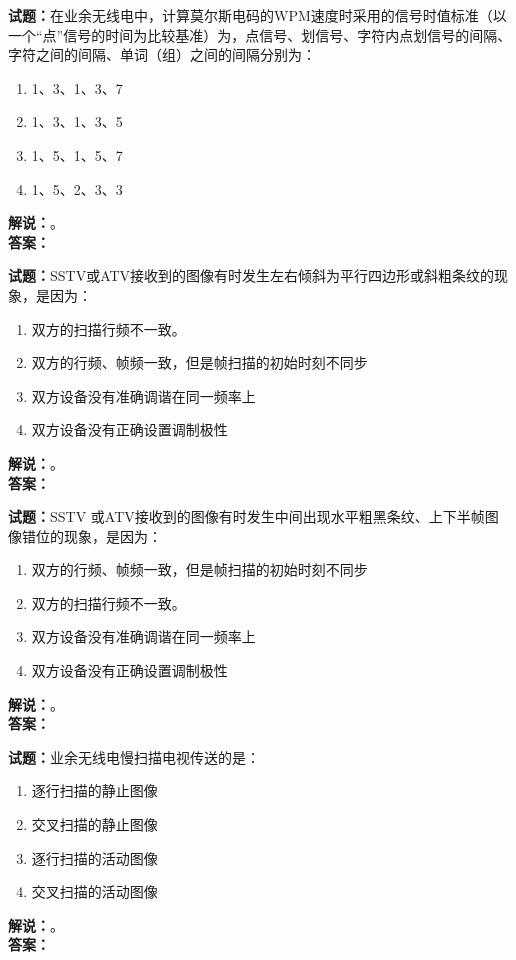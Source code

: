 \documentclass{ctexbook}
\begin{document}
\bigskip

\noindent\textbf{试题：}在业余无线电中，计算莫尔斯电码的WPM速度时采用的信号时值标准（以一个“点”信号的时间为比较基准）为，点信号、划信号、字符内点划信号的间隔、字符之间的间隔、单词（组）之间的间隔分别为：
\begin{enumerate}[leftmargin=3em]
  \item 1、3、1、3、7
  \item 1、3、1、3、5
  \item 1、5、1、5、7
  \item 1、5、2、3、3
\end{enumerate}
\noindent\textbf{解说：}\textbf{}。\\\noindent\textbf{答案：}

\bigskip

\noindent\textbf{试题：}SSTV或ATV接收到的图像有时发生左右倾斜为平行四边形或斜粗条纹的现象，是因为：
\begin{enumerate}[leftmargin=3em]
  \item 双方的扫描行频不一致。
  \item 双方的行频、帧频一致，但是帧扫描的初始时刻不同步
  \item 双方设备没有准确调谐在同一频率上
  \item 双方设备没有正确设置调制极性
\end{enumerate}
\noindent\textbf{解说：}\textbf{}。\\\noindent\textbf{答案：}

\bigskip

\noindent\textbf{试题：}SSTV 或ATV接收到的图像有时发生中间出现水平粗黑条纹、上下半帧图像错位的现象，是因为：
\begin{enumerate}[leftmargin=3em]
  \item 双方的行频、帧频一致，但是帧扫描的初始时刻不同步
  \item 双方的扫描行频不一致。
  \item 双方设备没有准确调谐在同一频率上
  \item 双方设备没有正确设置调制极性
\end{enumerate}
\noindent\textbf{解说：}\textbf{}。\\\noindent\textbf{答案：}

\bigskip

\noindent\textbf{试题：}业余无线电慢扫描电视传送的是：
\begin{enumerate}[leftmargin=3em]
  \item 逐行扫描的静止图像
  \item 交叉扫描的静止图像
  \item 逐行扫描的活动图像
  \item 交叉扫描的活动图像
\end{enumerate}
\noindent\textbf{解说：}\textbf{}。\\\noindent\textbf{答案：}
\end{document}
